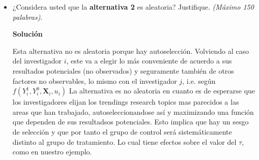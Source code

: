 \documentclass[a4paper, answers, addpoints, 11pt]{exam}
\newenvironment{solucion}{%
  \begin{mdframed}[
    backgroundcolor=blue!5,    %
    linecolor=blue!50,          %
    linewidth=2pt,              %
    leftmargin=10pt,            %
    rightmargin=8pt,           %
    topline=true,              %
    bottomline=true,            %
    roundcorner=10pt,           %
    innerleftmargin=10pt,       %
    innerrightmargin=10pt,      %
    innerbottommargin=10pt,     %
    innertopmargin=10pt         %
  ]%
  \begin{tcolorbox}[colframe=blue!50!black, colback=blue!50, coltitle=white, sharp corners=all, boxrule=1mm, width=\textwidth, halign=left, valign=center, top=0mm, bottom=0mm, left=0mm, right=0mm] \textbf{Solución} \end{tcolorbox} }{\end{mdframed}}
\begin{document}
\begin{itemize}
\begin{itemize}
\begin{solucion}
      Ahora bien, para cada investigador, esta probabilidad puede ser distinta, porque puede ser que por ejemplo, haya $20$ temas en la base de datos: $10$ trending y $10$ no trending. \begin{itemize}
          \item Considere un investigador $i$, ha trabajado $9$ de los trending research topics y ninguno de los no trending. Entonces como la probabilidad de asignación de los temas es uniforme, se tiene que la probabilidad de que le toque un trending va a ser de $1/11$ 
          \item Considere ahora un investigador $j$, que ha trabajado $6$ de los trending research topics y $3$ de los no trending. Entonces como la probabilidad de asignación de los temas es uniforme, se tiene que la probabilidad de que le toque un trending va a ser de $4/11$
      \end{itemize}
      
       En ese sentido, la alternativa es aleatoria pero el mecanismo no necesariamente va a estar perfectamente aleatorizado, porque la probabilidad de ser asignado al tratamiento podría ser muy baja para algunos investigadores mientras que muy alta para otros; en cualquier caso esto \textbf{no depende} de sus resultados potenciales.
       \end{solucion}
        
        \item ¿Considera usted que la \textbf{alternativa 2} es aleatoria? Justifique. \textit{(Máximo 150 palabras)}.
         \begin{solucion}
            Esta alternativa no es aleatoria porque hay autoselección. Volviendo al caso del investigador $i$, este va a elegir lo más conveniente de acuerdo a sus resultados potenciales (no observados) y seguramente también de otros factores no observables, lo mismo con el investigador $j$, i.e. según $f(Y^1_i,Y^0_i,\mathbf{X}_i,u_i)$
            La alternativa es no aleatoria en cuanto es de esperarse que los investigadores elijan los trendings research topics mas parecidos a las areas que han trabajado, autoseleccionandose así y maximizando una función que dependen de sus resultadsos potenciales. 
 Esto implica que hay un sesgo de selección y que por tanto el grupo de control será sistemáticamente distinto al grupo de tratamiento. Lo cual tiene efectos sobre el valor del $\tau$, como en nuestro ejemplo. 
             
     
         \end{solucion}
        

\end{itemize}
\end{itemize}
\end{document}
